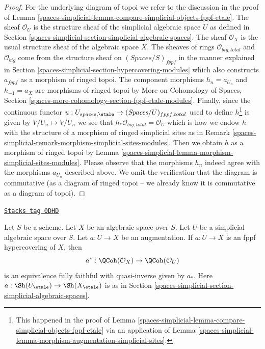 \begin{proof}
For the underlying diagram of topoi we refer to the discussion in
the proof of Lemma \ref{spaces-simplicial-lemma-compare-simplicial-objects-fppf-etale}.
The sheaf $\mathcal{O}_U$ is the structure sheaf of the
simplicial algebraic space $U$ as defined in
Section \ref{spaces-simplicial-section-simplicial-algebraic-spaces}.
The sheaf $\mathcal{O}_X$ is the usual structure sheaf of the algebraic
space $X$. The sheaves of rings $\mathcal{O}_{big, total}$ and
$\mathcal{O}_{big}$ come from the structure sheaf on
$(\textit{Spaces}/S)_{fppf}$ in the manner explained in
Section \ref{spaces-simplicial-section-hypercovering-modules}
which also constructs $a_{fppf}$ as a morphism of ringed topoi.
The component morphisms $h_n = a_{U_n}$ and $h_{-1} = a_X$
are morphisms of ringed topoi by
More on Cohomology of Spaces, Section
\ref{spaces-more-cohomology-section-fppf-etale-modules}.
Finally, since the continuous functor
$u : U_{spaces, \etale} \to (\textit{Spaces}/U)_{fppf, total}$
used to define $h$\footnote{This happened in the proof of
Lemma \ref{spaces-simplicial-lemma-compare-simplicial-objects-fppf-etale}
via an application of
Lemma \ref{spaces-simplicial-lemma-morphism-augmentation-simplicial-sites}.}
is given by $V/U_n \mapsto V/U_n$
we see that $h_*\mathcal{O}_{big, total} = \mathcal{O}_U$
which is how we endow $h$ with the structure of a morphism
of ringed simplicial sites as in
Remark \ref{spaces-simplicial-remark-morphism-simplicial-sites-modules}.
Then we obtain $h$ as a morphism of ringed topoi
by Lemma \ref{spaces-simplicial-lemma-morphism-simplicial-sites-modules}.
Please observe that the morphisms $h_n$ indeed agree
with the morphisms $a_{U_n}$ described above.
We omit the verification
that the diagram is commutative (as a diagram of
ringed topoi -- we already know it is commutative
as a diagram of topoi).
\end{proof}

\begin{lemma}
\label{spaces-simplicial-lemma-descent-qcoh-for-fppf-hypercovering}
\href{https://stacks.math.columbia.edu/tag/0DHD}{\texttt{Stacks tag 0DHD}}

Let $S$ be a scheme. Let $X$ be an algebraic space over $S$.
Let $U$ be a simplicial algebraic space over $S$. Let $a : U \to X$
be an augmentation. If $a : U \to X$ is an fppf hypercovering of $X$,
then
$$
a^* : \QCoh(\mathcal{O}_X) \to \QCoh(\mathcal{O}_U)
$$
is an equivalence fully faithful with quasi-inverse given by $a_*$.
Here $a : \Sh(U_\etale) \to \Sh(X_\etale)$
is as in Section \ref{spaces-simplicial-section-simplicial-algebraic-spaces}.
\end{lemma}

